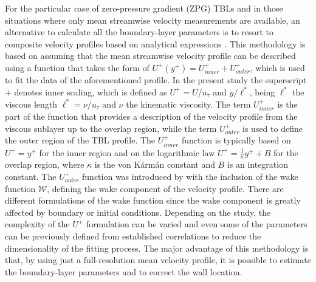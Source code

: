 For {the particular case of zero-pressure gradient (ZPG) TBLs and in} those situations where only mean streamwise velocity measurements are available, an alternative to calculate all the boundary-layer parameters is to resort to composite velocity profiles based on analytical expressions \citep{Chauhan:2009p10824,Coles:2006p898,Nickels:2004p15662,Rodriguez-Lopez2015}. This methodology is based on assuming that the mean streamwise velocity profile can be described using a function that takes the form of $U^+(y^+)= U^+_{inner}+U^+_{outer}$, which is used to fit the data of the aforementioned profile. In the present study the superscript $+$ denotes inner scaling, which is defined as $U^+=U/u_\tau$ and $y/\ell^*$, being $\ell^*$ the viscous length $\ell^* = \nu/u_\tau$ and $\nu$ the kinematic viscosity. The term $U^+_{inner}$ is the part of the function that provides a description of the velocity profile from the viscous sublayer up to the overlap region, while the term $U^+_{outer}$ is used to define the outer region of the TBL profile. The $U^+_{inner}$ function is typically based on $U^+=y^+$ for the inner region and on the logarithmic law $U^+=\frac{1}{\kappa}y^+ +B$ for the overlap region, where $\kappa$ is the von Kármán constant and $B$ is an integration constant. The $U^+_{outer}$ function was introduced by \citet{Coles:2006p898} with the inclusion of the wake function $\mathcal{W}$, defining the wake component of the velocity profile. There are different formulations of the wake function since the wake component is greatly affected by boundary or initial conditions. Depending on the study, the complexity of the $U^+$ formulation can be varied and even some of the parameters can be previously defined from established correlations to reduce the dimensionality of the fitting process. The major advantage of this methodology is that, by using just a full-resolution mean velocity profile, it is possible to estimate the {boundary-layer} parameters and to correct the wall location. 

